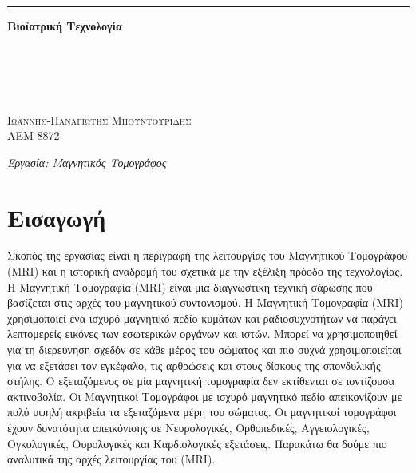 \documentclass{article}
\date{}
\renewcommand{\contentsname}%
    {Περιεχομενα}%
\begin{document}
\large{}
\renewcommand{\figurename}{Σχήμα:}
\renewcommand{\contentsname}{Περιεχόμενα}
\renewcommand{\tablename}{Πίνακας:}
 \begin{titlepage} %
	
	\raggedleft %
	
	\rule{1pt}{\textheight} %
	\hspace{0.05\textwidth} %
	\parbox[b]{0.75\textwidth}{ %
		
		{\Huge\bfseries Βιοϊατρική Τεχνολογία \\ \\
	\\ \\ }\\[2\baselineskip] %
		{\large\textit{ }}\\[4\baselineskip] %
		{\large\textsc{Ιωάννης-Παναγιώτης Μπουντουρίδης}} \\[0.6\baselineskip]
  
	{\large\textsc{ΑΕΜ 8872}} 	
		\vspace{0.38\textheight} %
		
		{\noindent \textit{Εργασία: Μαγνητικός Τομογράφος}}\\[\baselineskip] %
	}

\end{titlepage}
\newpage
\large{}
\tableofcontents
\newpage
\section{Εισαγωγή}
Σκοπός της εργασίας είναι η περιγραφή της λειτουργίας του Μαγνητικού Τομογράφου (MRI) και η ιστορική αναδρομή του σχετικά με την εξέλιξη πρόοδο της τεχνολογίας. Η Μαγνητική Τομογραφία (MRI) είναι μια διαγνωστική τεχνική σάρωσης που βασίζεται στις αρχές του μαγνητικού συντονισμού. Η Μαγνητική Τομογραφία (MRI) χρησιμοποιεί ένα ισχυρό μαγνητικό πεδίο κυμάτων και ραδιοσυχνοτήτων να παράγει λεπτομερείς εικόνες των εσωτερικών οργάνων και ιστών. Μπορεί να χρησιμοποιηθεί για τη διερεύνηση σχεδόν σε κάθε μέρος του σώματος και πιο συχνά χρησιμοποιείται για να εξετάσει τον εγκέφαλο, τις αρθρώσεις και στους δίσκους της σπονδυλικής στήλης. Ο εξεταζόμενος σε μία μαγνητική τομογραφία δεν εκτίθενται σε ιοντίζουσα ακτινοβολία. Οι Μαγνητικοί Τομογράφοι με ισχυρό μαγνητικό πεδίο απεικονίζουν με πολύ υψηλή ακριβεία τα εξεταζόμενα μέρη του σώματος. Οι μαγνητικοί τομογράφοι έχουν δυνατότητα απεικόνισης σε Νευρολογικές, Ορθοπεδικές, Αγγειολογικές, Ογκολογικές, Ουρολογικές και Καρδιολογικές εξετάσεις. Παρακάτω θα δούμε πιο αναλυτικά της αρχές λειτουργίας του (MRI).
\newpage
\end{document}
